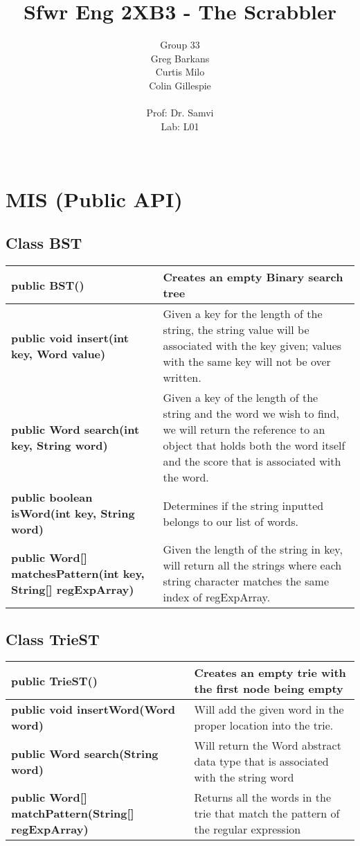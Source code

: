 \documentclass[11pt]{article}
\title{\vspace{4cm} 
	 Sfwr Eng 2XB3 - The Scrabbler}      %
\author{ 
	Group 33 \\       %
	Greg Barkans \\
	Curtis Milo \\
	Colin Gillespie \\
	 \vspace{1cm} \\
	Prof: Dr. Samvi \\
	Lab: L01 \\
	 \vspace{2cm} \\
}
\date{}
\begin{document}
\maketitle
\newpage
\tableofcontents
\newpage

\section{MIS (Public API)}

\subsection{Class BST}

\begin{tabular}{|p{}|p{}|}
\hline
\textbf{public BST()} & Creates an empty Binary search tree \\
\hline
\textbf{public void insert(int key, Word value)} & Given a key for the length of the string,  the string value will be associated with the key given;  values with the same key will not be over written.\\
\hline
\textbf{public Word search(int key, String word)} & Given a key of the length of the string and the word we wish to find, we will return the reference to an object that holds both the word itself and the score that is associated with the word.\\
\hline
\textbf{public  boolean isWord(int key, String word)} & Determines if the string inputted belongs to our list of words.\\
\hline
\textbf{public Word[] matchesPattern(int key, String[] regExpArray)} & Given the length of the string in key, will return all the strings where each string character matches the same index of regExpArray.\\
\hline
\end{tabular}


\subsection{Class TrieST}

\begin{tabular}{|p{}|p{}|}
\hline
\textbf{public TrieST()} & Creates an empty trie with the first node being empty\\
\hline
\textbf{public void insertWord(Word word)} & Will add the given word in the proper location into the trie. \\
\hline
\textbf{public Word search(String word)} & Will return the Word abstract data type that is associated with the string word\\
\hline
\textbf{public Word[] matchPattern(String[] regExpArray)} & Returns all the words in the trie that match the pattern of the regular expression\\
\hline
\end{tabular}
\end{document}
